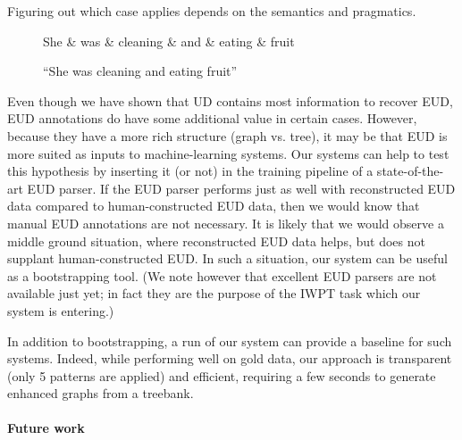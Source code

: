 \documentclass[11pt,a4paper]{article}
\begin{document}
\begin{itemize}
  Figuring out which case applies depends on the semantics and
  pragmatics.

\begin{figure}[h]
    \centering
    \begin{dependency}
    \begin{deptext}[column sep=0.1cm]
    She \& was \& cleaning \& and \& eating \& fruit  \\
    \end{deptext}
    \end{dependency}
    \caption{``She was cleaning and eating fruit''}
    \label{fig:conj-obj}
\end{figure}
 

\end{itemize}

Even though we have shown that UD contains most information to recover
EUD, EUD annotations do have some additional value in certain
cases. However, because they have a more rich structure (graph
vs. tree), it may be that EUD is more suited as inputs to
machine-learning systems. Our systems can help to test this hypothesis
by inserting it (or not) in the training pipeline of a state-of-the-art EUD
parser. If the EUD parser performs just as well with reconstructed EUD
data compared to human-constructed EUD data, then we would know that
manual EUD annotations are not necessary.  It is likely that we would observe
a middle ground situation, where reconstructed EUD data helps, but
does not supplant human-constructed EUD. In such a situation, our
system can be useful as a bootstrapping tool. (We note however that
excellent EUD parsers are not available just yet; in fact they are the
purpose of the IWPT task which our system is entering.)

In addition to bootstrapping, a run of our system can provide a
baseline for such systems.  Indeed, while performing well on gold
data, our approach is transparent (only 5 patterns are applied) and
efficient, requiring a few seconds to generate enhanced graphs from a
treebank. 

\paragraph{ Future work }
\end{document}
